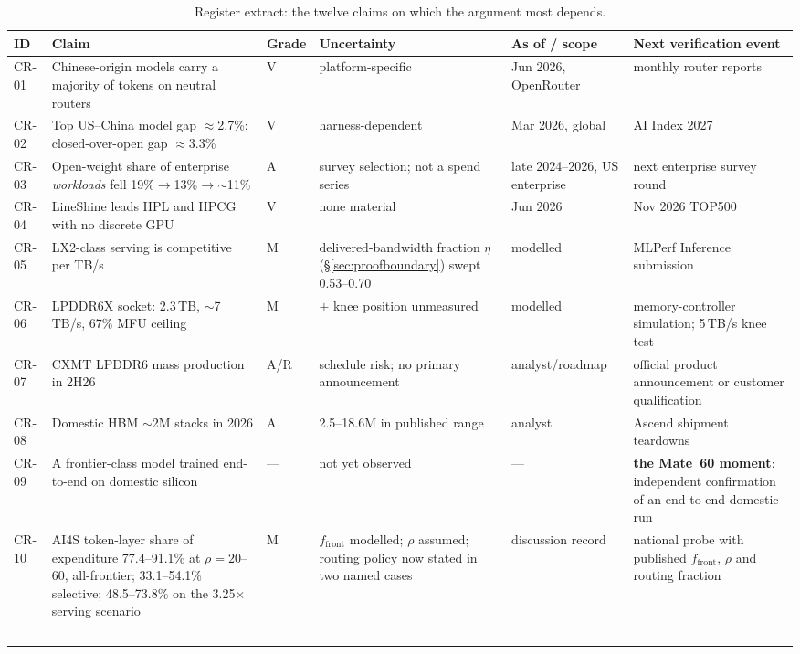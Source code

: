 \begin{table}[htbp]
  \centering
  \tiny
  \setlength{\tabcolsep}{3pt}
  \caption{Register extract: the twelve claims on which the argument most depends.}
  \label{tab:register}
  \begin{tabular}{p{8mm}p{45mm}p{7mm}p{20mm}p{21mm}p{27mm}}
    \toprule
    ID & Claim & Grade & Uncertainty & As of / scope & Next verification event \\
    \midrule
    CR-01 & Chinese-origin models carry a majority of tokens on neutral routers & V & platform-specific & Jun 2026, OpenRouter & monthly router reports \\
    CR-02 & Top US--China model gap $\approx$2.7\%; closed-over-open gap $\approx$3.3\% & V & harness-dependent & Mar 2026, global & AI Index 2027 \\
    CR-03 & Open-weight share of enterprise \emph{workloads} fell 19\%$\to$13\%$\to$$\sim$11\% & A & survey selection; not a spend series & late 2024--2026, US enterprise & next enterprise survey round \\
    CR-04 & LineShine leads HPL and HPCG with no discrete GPU & V & none material & Jun 2026 & Nov 2026 TOP500 \\
    CR-05 & LX2-class serving is competitive per TB/s & M & delivered-bandwidth fraction $\eta$ (\S\ref{sec:proofboundary}) swept 0.53--0.70 & modelled & MLPerf Inference submission \\
    CR-06 & LPDDR6X socket: 2.3\,TB, $\sim$7\,TB/s, 67\% MFU ceiling & M & $\pm$ knee position unmeasured & modelled & memory-controller simulation; 5\,TB/s knee test \\
    CR-07 & CXMT LPDDR6 mass production in 2H26 & A/R & schedule risk; no primary announcement & analyst/roadmap & official product announcement or customer qualification \\
    CR-08 & Domestic HBM $\sim$2M stacks in 2026 & A & 2.5--18.6M in published range & analyst & Ascend shipment teardowns \\
    CR-09 & A frontier-class model trained end-to-end on domestic silicon & --- & not yet observed & --- & \textbf{the Mate~60 moment}: independent confirmation of an end-to-end domestic run \\
    CR-10 & AI4S token-layer share of expenditure 77.4--91.1\% at $\rho=20$--$60$, all-frontier; 33.1--54.1\% selective; 48.5--73.8\% on the 3.25$\times$ serving scenario & M & $f_{\mathrm{front}}$ modelled; $\rho$ assumed; routing policy now stated in two named cases & discussion record & national probe with published $f_{\mathrm{front}}$, $\rho$ and routing fraction \\
$$
\end{tabular}
\end{table}
